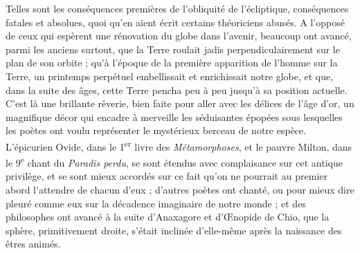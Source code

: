 \documentclass[a4paper, 11pt, oneside]{article}
\begin{document}
Telles sont les conséquences premières de l'obliquité de l'écliptique, conséquences fatales et absolues, quoi qu'en aient écrit certains théoriciens abusés. A l'opposé de ceux qui espèrent une rénovation du globe dans l'avenir, beaucoup ont avancé, parmi les anciens surtout, que la Terre roulait jadis perpendiculairement sur le plan de son orbite ; qu'à l'époque de la première apparition de l'homme sur la Terre, un printemps perpétuel embellissait et enrichissait notre globe, et que, dans la suite des âges, cette Terre pencha peu à peu jusqu'à sa position actuelle. C'est là une brillante rêverie, bien faite pour aller avec les délices de l'âge d'or, un magnifique décor qui encadre à merveille les séduisantes épopées sous lesquelles les poètes ont voulu représenter le mystérieux berceau de notre espèce. L'épicurien Ovide, dans le 1\textsuperscript{er} livre des \emph{Métamorphoses}, et le pauvre Milton, dans le 9\textsuperscript{e} chant du \emph{Paradis perdu}, se sont étendus avec complaisance sur cet antique privilège, et se sont mieux accordés sur ce fait qu'on ne pourrait au premier abord l'attendre de chacun d'eux ; d'autres poètes ont chanté, ou pour mieux dire pleuré comme eux sur la décadence imaginaire de notre monde ; et des philosophes ont avancé à la suite d'Anaxagore et d'Œnopide de Chio, que la sphère, primitivement droite, s'était inclinée d'elle-même après la naissance des êtres animés.
\end{document}
